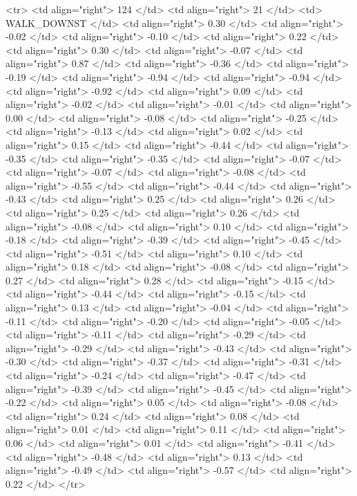   <tr> <td align="right"> 124 </td> <td align="right">  21 </td> <td> WALK_DOWNST </td> <td align="right"> 0.30 </td> <td align="right"> -0.02 </td> <td align="right"> -0.10 </td> <td align="right"> 0.22 </td> <td align="right"> 0.30 </td> <td align="right"> -0.07 </td> <td align="right"> 0.87 </td> <td align="right"> -0.36 </td> <td align="right"> -0.19 </td> <td align="right"> -0.94 </td> <td align="right"> -0.94 </td> <td align="right"> -0.92 </td> <td align="right"> 0.09 </td> <td align="right"> -0.02 </td> <td align="right"> -0.01 </td> <td align="right"> 0.00 </td> <td align="right"> -0.08 </td> <td align="right"> -0.25 </td> <td align="right"> -0.13 </td> <td align="right"> 0.02 </td> <td align="right"> 0.15 </td> <td align="right"> -0.44 </td> <td align="right"> -0.35 </td> <td align="right"> -0.35 </td> <td align="right"> -0.07 </td> <td align="right"> -0.07 </td> <td align="right"> -0.08 </td> <td align="right"> -0.55 </td> <td align="right"> -0.44 </td> <td align="right"> -0.43 </td> <td align="right"> 0.25 </td> <td align="right"> 0.26 </td> <td align="right"> 0.25 </td> <td align="right"> 0.26 </td> <td align="right"> -0.08 </td> <td align="right"> 0.10 </td> <td align="right"> -0.18 </td> <td align="right"> -0.39 </td> <td align="right"> -0.45 </td> <td align="right"> -0.51 </td> <td align="right"> 0.10 </td> <td align="right"> 0.18 </td> <td align="right"> -0.08 </td> <td align="right"> 0.27 </td> <td align="right"> 0.28 </td> <td align="right"> -0.15 </td> <td align="right"> -0.44 </td> <td align="right"> -0.15 </td> <td align="right"> 0.13 </td> <td align="right"> -0.04 </td> <td align="right"> -0.11 </td> <td align="right"> -0.20 </td> <td align="right"> -0.05 </td> <td align="right"> -0.11 </td> <td align="right"> -0.29 </td> <td align="right"> -0.29 </td> <td align="right"> -0.43 </td> <td align="right"> -0.30 </td> <td align="right"> -0.37 </td> <td align="right"> -0.31 </td> <td align="right"> -0.24 </td> <td align="right"> -0.47 </td> <td align="right"> -0.39 </td> <td align="right"> -0.45 </td> <td align="right"> -0.22 </td> <td align="right"> 0.05 </td> <td align="right"> -0.08 </td> <td align="right"> 0.24 </td> <td align="right"> 0.08 </td> <td align="right"> 0.01 </td> <td align="right"> 0.11 </td> <td align="right"> 0.06 </td> <td align="right"> 0.01 </td> <td align="right"> -0.41 </td> <td align="right"> -0.48 </td> <td align="right"> 0.13 </td> <td align="right"> -0.49 </td> <td align="right"> -0.57 </td> <td align="right"> 0.22 </td> </tr>
